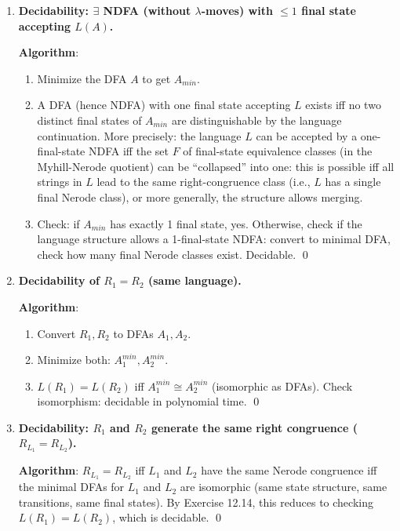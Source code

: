 \begin{enumerate}[{12.}1. ]
\item \textbf{Decidability: $\exists$ NDFA (without $\lambda$-moves) with $\leq 1$ final state accepting $L(A)$.}

\textbf{Algorithm}:
\begin{enumerate}
\item Minimize the DFA $A$ to get $A_{min}$.
\item A DFA (hence NDFA) with one final state accepting $L$ exists iff no two distinct final states of $A_{min}$ are distinguishable by the language continuation. More precisely: the language $L$ can be accepted by a one-final-state NDFA iff the set $F$ of final-state equivalence classes (in the Myhill-Nerode quotient) can be ``collapsed'' into one: this is possible iff all strings in $L$ lead to the same right-congruence class (i.e., $L$ has a single final Nerode class), or more generally, the structure allows merging.
\item Check: if $A_{min}$ has exactly 1 final state, yes. Otherwise, check if the language structure allows a 1-final-state NDFA: convert to minimal DFA, check how many final Nerode classes exist. Decidable. \qed
\end{enumerate}

\item \textbf{Decidability of $R_1 = R_2$ (same language).}

\textbf{Algorithm}:
\begin{enumerate}
\item Convert $R_1, R_2$ to DFAs $A_1, A_2$.
\item Minimize both: $A_1^{min}, A_2^{min}$.
\item $L(R_1)=L(R_2)$ iff $A_1^{min} \cong A_2^{min}$ (isomorphic as DFAs). Check isomorphism: decidable in polynomial time. \qed
\end{enumerate}

\item \textbf{Decidability: $R_1$ and $R_2$ generate the same right congruence ($R_{L_1}=R_{L_2}$).}

\textbf{Algorithm}:
$R_{L_1} = R_{L_2}$ iff $L_1$ and $L_2$ have the same Nerode congruence iff the minimal DFAs for $L_1$ and $L_2$ are isomorphic (same state structure, same transitions, same final states). By Exercise 12.14, this reduces to checking $L(R_1)=L(R_2)$, which is decidable. \qed


\end{enumerate}
